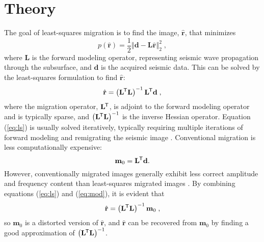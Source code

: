 \section{Theory}
    The goal of least-squares migration is to find the image, $\hat{\mathbf{r}}$, that minimizes
    \begin{equation}
        p(\hat{\mathbf{r}}) = \frac{1}{2}\left \Vert \mathbf{\mathbf{d} - L\hat{r}} \right \Vert _2^2\;,
    \end{equation}
    where $\mathbf{L}$ is the forward modeling operator, representing seismic wave propagation through the subsurface, and $\mathbf{d}$ is the acquired seismic data.
    This can be solved by the least-squares formulation to find $\hat{\mathbf{r}}$:
    \begin{equation}
        \hat{\mathbf{r}} = \left ( \mathbf{L}^{\mkern-1.5mu\mathsf{T}}\mathbf{L}\right )^{-1}\mathbf{L}^{\mkern-1.5mu\mathsf{T}}\mathbf{d}\;,
        \label{eq:ls}
    \end{equation}
    where the migration operator, $\mathbf{L}^{\mkern-1.5mu\mathsf{T}}$, is adjoint to the forward modeling operator and is typically sparse, and $\left ( \mathbf{L}^{\mkern-1.5mu\mathsf{T}} \mathbf{L} \right )^{-1}$ is the inverse Hessian operator.
    Equation (\ref{eq:ls}) is usually solved iteratively, typically requiring multiple iterations of forward modeling and remigrating the seismic image \cite[]{wem,xue16}. 
Conventional migration is less computationally expensive:
\begin{equation}
    \mathbf{m}_0 = \mathbf{L}^{\mkern-1.5mu\mathsf{T}}\mathbf{d}.
    \label{eq:mod}
\end{equation}
    However, conventionally migrated images generally exhibit less correct amplitude and frequency content than least-squares migrated images \cite[]{dutta14}. 
    By combining equations (\ref{eq:ls}) and (\ref{eq:mod}), it is evident that
\begin{equation}
    \hat{\mathbf{r}} = \left ( \mathbf{L}^{\mkern-1.5mu\mathsf{T}}\mathbf{L}\right )^{-1}\mathbf{m}_{0} \;,
\end{equation}
    so $\mathbf{m}_0$ is a distorted version of $\hat{\mathbf{r}}$, and $\hat{\mathbf{r}}$ can be recovered from $\mathbf{m}_0$ by finding a good approximation of $\left ( \mathbf{L}^{\mkern-1.5mu\mathsf{T}}\mathbf{L}\right) ^{-1}$.

